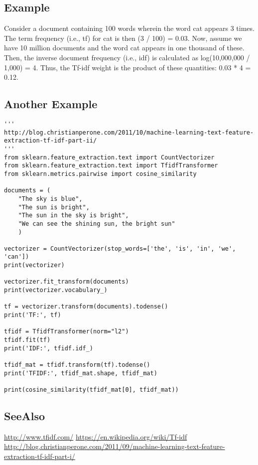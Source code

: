 \subsection{Example}

Consider a document containing 100 words wherein the word cat appears 3 times.
The term frequency (i.e., tf) for cat is then (3 / 100) = 0.03. Now, assume we
have 10 million documents and the word cat appears in one thousand of these.
Then, the inverse document frequency (i.e., idf) is calculated as
log(10,000,000 / 1,000) = 4. Thus, the Tf-idf weight is the product of these
quantities: 0.03 * 4 = 0.12.

\subsection{Another Example}

\begin{verbatim}
'''
http://blog.christianperone.com/2011/10/machine-learning-text-feature-extraction-tf-idf-part-ii/
'''
from sklearn.feature_extraction.text import CountVectorizer
from sklearn.feature_extraction.text import TfidfTransformer
from sklearn.metrics.pairwise import cosine_similarity

documents = (
    "The sky is blue",
    "The sun is bright",
    "The sun in the sky is bright",
    "We can see the shining sun, the bright sun"
    )

vectorizer = CountVectorizer(stop_words=['the', 'is', 'in', 'we', 'can'])
print(vectorizer)

vectorizer.fit_transform(documents)
print(vectorizer.vocabulary_)

tf = vectorizer.transform(documents).todense()
print('TF:', tf)

tfidf = TfidfTransformer(norm="l2")
tfidf.fit(tf)
print('IDF:', tfidf.idf_)

tfidf_mat = tfidf.transform(tf).todense()
print('TFIDF:', tfidf_mat.shape, tfidf_mat)

print(cosine_similarity(tfidf_mat[0], tfidf_mat))
\end{verbatim}


\subsection{SeeAlso}

\url{http://www.tfidf.com/}
\url{https://en.wikipedia.org/wiki/Tf-idf}
\url{http://blog.christianperone.com/2011/09/machine-learning-text-feature-extraction-tf-idf-part-i/}
